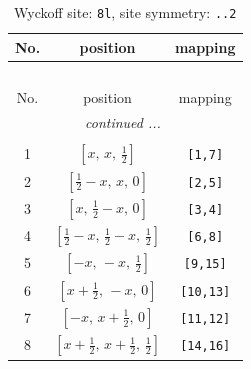 \documentclass[fleqn,8pt]{jsarticle}
\begin{document}
\begin{longtable}{ccc}
\caption{Wyckoff site: {\tt 8l}, site symmetry: {\tt ..2}}
 \\
 \hline \hline
No. & position & mapping \\ \hline \endfirsthead

\multicolumn{2}{l}{\tablename\ \thetable{}} \\
 \hline \hline
No. & position & mapping \\ \hline \endhead

 \hline \hline
\multicolumn{2}{r}{\footnotesize\it continued ...} \\ \endfoot

 \hline \hline
\multicolumn{2}{r}{} \\ \endlastfoot

1 & $\left[ x,\, x,\, \frac{1}{2} \right]$ & {\tt [1,7]} \\ \hline
2 & $\left[ \frac{1}{2} - x,\, x,\, 0 \right]$ & {\tt [2,5]} \\ \hline
3 & $\left[ x,\, \frac{1}{2} - x,\, 0 \right]$ & {\tt [3,4]} \\ \hline
4 & $\left[ \frac{1}{2} - x,\, \frac{1}{2} - x,\, \frac{1}{2} \right]$ & {\tt [6,8]} \\ \hline
5 & $\left[ - x,\, - x,\, \frac{1}{2} \right]$ & {\tt [9,15]} \\ \hline
6 & $\left[ x + \frac{1}{2},\, - x,\, 0 \right]$ & {\tt [10,13]} \\ \hline
7 & $\left[ - x,\, x + \frac{1}{2},\, 0 \right]$ & {\tt [11,12]} \\ \hline
8 & $\left[ x + \frac{1}{2},\, x + \frac{1}{2},\, \frac{1}{2} \right]$ & {\tt [14,16]} \\
\end{longtable}
\renewcommand{\arraystretch}{1.2}
\end{document}
